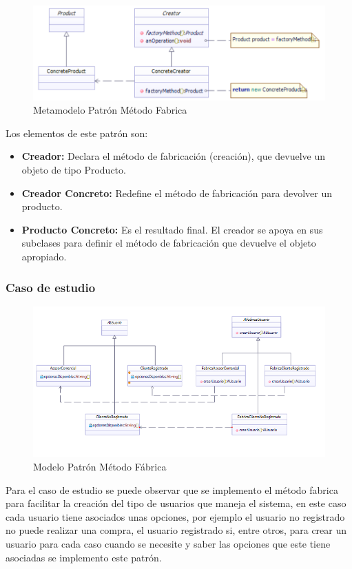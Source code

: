 \begin{figure}[th!]
	\centering
	\includegraphics[width=1.0\linewidth]{arquitectura/imagenes/modeloMetFab}
	\caption{Metamodelo Patrón Método Fabrica}
	\label{fig:metamodelo metodo fabrica}
\end{figure}


Los elementos de este patrón son:
\begin{itemize}
	\item \textbf{Creador: }Declara el método de fabricación (creación), que devuelve un objeto de tipo Producto.
	\item \textbf{Creador Concreto: }Redefine el método de fabricación para devolver un producto.
	\item \textbf{Producto Concreto: }Es el resultado final. El creador se apoya en sus subclases para definir el método de fabricación que devuelve el objeto apropiado.
\end{itemize}


\subsubsection{Caso de estudio}
\begin{figure}[h!]
	\centering
	\includegraphics[width=0.7\linewidth]{arquitectura/imagenes/DiagramaMetodoFabrica}
	\caption{Modelo Patrón Método Fábrica}
\end{figure}

Para el caso de estudio se puede observar que se implemento el método fabrica para facilitar la creación del tipo de usuarios que maneja el sistema, en este caso cada usuario tiene asociados unas opciones, por ejemplo el usuario no registrado no puede realizar una compra, el usuario registrado si, entre otros, para crear un usuario para cada caso cuando se necesite y saber las opciones que este tiene asociadas se implemento este patrón.
\newpage


